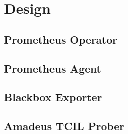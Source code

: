 
\chapter{Design}\label{chapter:design}

\section{Prometheus Operator}

\section{Prometheus Agent}

\section{Blackbox Exporter}

\section{Amadeus TCIL Prober}